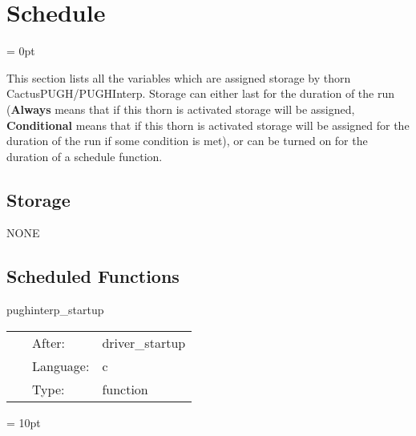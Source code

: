
\section{Schedule} 


\parskip = 0pt


\noindent This section lists all the variables which are assigned storage by thorn CactusPUGH/PUGHInterp.  Storage can either last for the duration of the run ({\bf Always} means that if this thorn is activated storage will be assigned, {\bf Conditional} means that if this thorn is activated storage will be assigned for the duration of the run if some condition is met), or can be turned on for the duration of a schedule function.


\subsection*{Storage}NONE
\subsection*{Scheduled Functions}
\vspace{5mm}


\hspace{5mm} pughinterp\_startup 

\hspace{5mm}{\it pughinterp startup routine } 


\hspace{5mm}

 \begin{tabular*}{160mm}{cll} 
~ & After:  & driver\_startup \\ 
~ & Language:  & c \\ 
~ & Type:  & function \\ 
\end{tabular*} 



\vspace{5mm}\parskip = 10pt 

